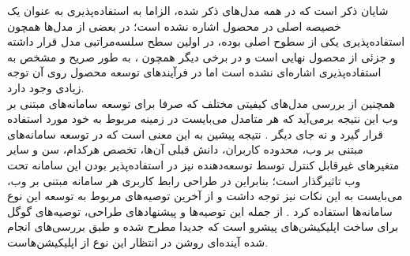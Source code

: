 	شایان ذکر است که در همه مدل‌های ذکر شده، الزاما به استفاده‌پذیری به عنوان یک خصیصه اصلی در محصول اشاره نشده است؛ در بعضی از مدل‌ها همچون
	استفاده‌پذیری یکی از سطوح اصلی بوده، در اولین سطح سلسه‌مراتبی مدل قرار داشته و جزئی از محصول نهایی است و در برخی دیگر همچون
	،
	به طور صریح و مشخص به استفاده‌پذیری اشاره‌ای نشده است اما در فرآیندهای توسعه محصول روی آن توجه زیادی وجود دارد.\\
	همچنین از بررسی مدل‌های کیفیتی مختلف که صرفا برای توسعه سامانه‌های مبتنی بر وب این نتیجه برمی‌آید که هر متامدل می‌بایست در زمینه مربوط به خود مورد استفاده قرار گیرد و نه جای دیگر
	\cite{noauthor_measuringu:_2018}.
	نتیجه پیشین به این معنی است که در توسعه سامانه‌های مبتنی بر وب، محدوده کاربران، دانش قبلی آن‌ها، تخصص هرکدام، سن و سایر متغیرهای غیرقابل کنترل توسط توسعه‌دهنده نیز در استفاده‌پذیر بودن این سامانه تحت وب تاثیرگذار است؛ بنابراین در طراحی رابط کاربری هر سامانه مبتنی بر وب، می‌بایست به این نکات نیز توجه داشت و از آخرین توصیه‌های مربوط به توسعه این نوع سامانه‌ها استفاده کرد
	\cite{albert_measuring_2013}.
	از جمله این توصیه‌ها و پیشنهاد‌های طراحی، توصیه‌های گوگل برای ساخت اپلیکیشن‌های پیشرو
	\cite{noauthor_progressive_nodate}
	است که جدیدا مطرح شده و طبق بررسی‌های انجام شده آینده‌ای روشن در انتظار این نوع از اپلیکیشن‌هاست.
	

